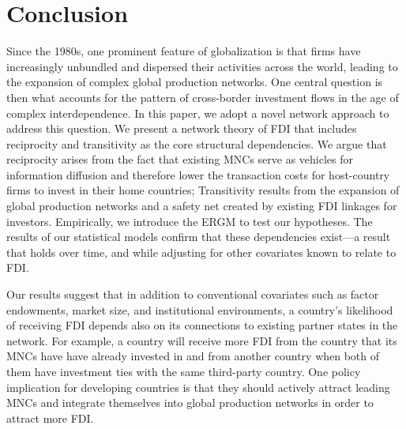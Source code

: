 \documentclass[reqno,onecolumn,letterpaper,12pt]{article}
\begin{document}
\section{Conclusion}

Since the 1980s, one prominent feature of globalization is that firms have increasingly unbundled and dispersed their activities across the world, leading to the expansion of complex global production networks. One central question is then what accounts for the pattern of cross-border investment flows in the age of complex interdependence. In this paper, we adopt a novel network approach to address this question. %
We present a network theory of FDI that includes reciprocity and transitivity as the core structural dependencies. We argue that reciprocity arises from the fact %
that existing MNCs serve as vehicles for information diffusion and therefore lower the transaction costs for host-country firms to invest in their home countries; Transitivity results from the expansion of global production networks and a safety net created by existing FDI linkages for investors. %
Empirically, we introduce the ERGM to test our hypotheses. The results of our statistical models confirm that these dependencies exist---a result that holds over time, and while adjusting for other covariates known to relate to FDI.

Our results suggest that in addition to conventional covariates such as factor endowments, market size, and institutional environments, a country's likelihood of receiving FDI depends also on its connections to existing partner states in the network. For example, a country will receive more FDI from the country that its MNCs have have already invested in and from another country when both of them have investment ties with the same third-party country. One policy implication for developing countries is that they should actively attract leading MNCs and integrate themselves into global production networks in order to attract more FDI.

\end{document}
